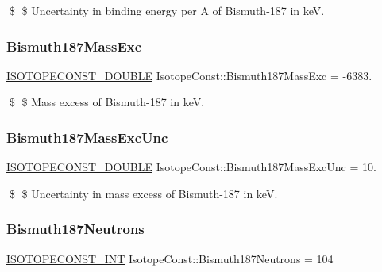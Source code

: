 \$ \$ Uncertainty in binding energy per A of Bismuth-\/187 in keV. \mbox{\label{group___isotope_const-_bismuth-_bi187_ga2d6ce899f9f8292d91df96b113238602}} 
\subsubsection{\texorpdfstring{Bismuth187\+Mass\+Exc}{Bismuth187MassExc}}
{\footnotesize\ttfamily \mbox{\hyperlink{group___isotope_const-_macros_ga8f45a7272ce02c0b4c65c44636ed719a}{I\+S\+O\+T\+O\+P\+E\+C\+O\+N\+S\+T\+\_\+\+D\+O\+U\+B\+LE}} Isotope\+Const\+::\+Bismuth187\+Mass\+Exc = -\/6383.}

\$ \$ Mass excess of Bismuth-\/187 in keV. \mbox{\label{group___isotope_const-_bismuth-_bi187_gaeb75f2af33b650f1789b2ca677d63083}} 
\subsubsection{\texorpdfstring{Bismuth187\+Mass\+Exc\+Unc}{Bismuth187MassExcUnc}}
{\footnotesize\ttfamily \mbox{\hyperlink{group___isotope_const-_macros_ga8f45a7272ce02c0b4c65c44636ed719a}{I\+S\+O\+T\+O\+P\+E\+C\+O\+N\+S\+T\+\_\+\+D\+O\+U\+B\+LE}} Isotope\+Const\+::\+Bismuth187\+Mass\+Exc\+Unc = 10.}

\$ \$ Uncertainty in mass excess of Bismuth-\/187 in keV. \mbox{\label{group___isotope_const-_bismuth-_bi187_gafad61e6e12be4c19be720d58a350fbe2}} 
\subsubsection{\texorpdfstring{Bismuth187\+Neutrons}{Bismuth187Neutrons}}
{\footnotesize\ttfamily \mbox{\hyperlink{group___isotope_const-_macros_ga5f18360b3e99483a35c32d789e62621c}{I\+S\+O\+T\+O\+P\+E\+C\+O\+N\+S\+T\+\_\+\+I\+NT}} Isotope\+Const\+::\+Bismuth187\+Neutrons = 104}

